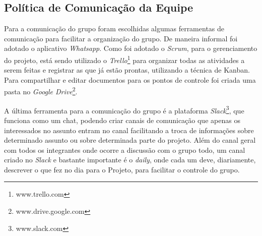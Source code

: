 \subsection{Política de Comunicação da Equipe} %
\label{sub:política_de_comunicação_da_equipe}
	
	Para a comunicação do grupo foram escolhidas algumas ferramentas de comunicação para facilitar a organização do grupo. De maneira informal foi adotado o aplicativo \textit{Whatsapp}. Como foi adotado o \textit{Scrum}, para o gerenciamento do projeto, está sendo utilizado o \textit{Trello}\footnote{www.trello.com} para organizar todas as atividades a serem feitas e registrar as que já estão prontas, utilizando a técnica de Kanban. Para compartilhar e editar documentos para os pontos de controle foi criada uma pasta no \textit{Google Drive}\footnote{www.drive.google.com}. 

	A última ferramenta para a comunicação do grupo é a plataforma \textit{Slack}\footnote{www.slack.com}, que funciona como um chat, podendo criar canais de comunicação que apenas os interessados no assunto entram no canal facilitando a troca de informações sobre determinado assunto ou sobre determinada parte do projeto. Além do canal geral com todos os integrantes onde ocorre a discussão com o grupo todo, um canal criado no \textit{Slack} e bastante importante é o \textit{daily}, onde cada um deve, diariamente, descrever o que fez no dia para o Projeto, para facilitar o controle do grupo. 
